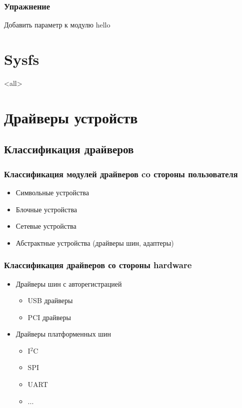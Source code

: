\begin{frame}
  \frametitle{Упражнение}
  \begin{center}
    Добавить параметр к модулю hello
  \end{center}
\end{frame}

\section{Sysfs}
\mode<all>{}


\section{Драйверы устройств}
\subsection{Классификация драйверов}
\begin{frame}
  \frametitle{Классификация модулей драйверов co стороны пользователя}
  \begin{itemize}
    \item Символьные устройства
    \item Блочные устройства
    \item Сетевые устройства
    \item Абстрактные устройства (драйверы шин, адаптеры)
  \end{itemize}
\end{frame}
\begin{frame}
  \frametitle{Классификация драйверов со стороны hardware}
  \begin{itemize}
    \item Драйверы шин с авторегистрацией
      \begin{itemize}
        \item USB драйверы
        \item PCI драйверы
      \end{itemize}
    \item Драйверы платформенных шин
      \begin{itemize}
        \item I$^2$C
        \item SPI
        \item UART
        \item ...
      \end{itemize}
  \end{itemize}
\end{frame}
